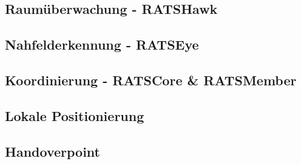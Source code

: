 \subsection{Raumüberwachung - RATSHawk}
\subsection{Nahfelderkennung - RATSEye}
\subsection{Koordinierung - RATSCore \& RATSMember}
\subsection{Lokale Positionierung}
\subsection{Handoverpoint}
\label{sec:impl-hop}
